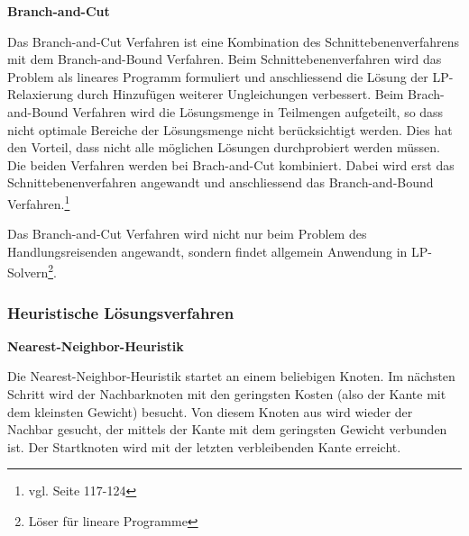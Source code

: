 \documentclass[11pt,a4paper]{article}
\begin{document}
\medskip

\begin{flushleft}
\textbf{Branch-and-Cut}

Das Branch-and-Cut Verfahren ist eine Kombination des Schnittebenenverfahrens mit dem Branch-and-Bound Verfahren. 
Beim Schnittebenenverfahren wird das Problem als lineares Programm formuliert und anschliessend die Lösung der LP-Relaxierung durch Hinzufügen weiterer Ungleichungen verbessert.
Beim Brach-and-Bound Verfahren wird die Lösungsmenge in Teilmengen aufgeteilt, so dass nicht optimale Bereiche der Lösungsmenge nicht berücksichtigt werden. Dies hat den Vorteil, dass nicht alle möglichen Lösungen durchprobiert werden müssen.
Die beiden Verfahren werden bei Brach-and-Cut kombiniert. Dabei wird erst das Schnittebenenverfahren angewandt und anschliessend das Branch-and-Bound Verfahren.\footnote{vgl. \cite{applegate06} Seite 117-124}

Das Branch-and-Cut Verfahren wird nicht nur beim Problem des Handlungsreisenden angewandt, sondern findet allgemein Anwendung in LP-Solvern\footnote{Löser für lineare Programme}.

\end{flushleft}

\subsubsection{Heuristische Lösungsverfahren}
\begin{flushleft}
\textbf{Nearest-Neighbor-Heuristik}

Die Nearest-Neighbor-Heuristik startet an einem beliebigen Knoten. Im nächsten Schritt wird der Nachbarknoten mit den geringsten Kosten (also der Kante mit dem kleinsten Gewicht) besucht. Von diesem Knoten aus wird wieder der Nachbar gesucht, der mittels der Kante  mit dem geringsten Gewicht verbunden ist. Der Startknoten wird mit der letzten verbleibenden Kante erreicht.\cite{gutin02}
\end{flushleft}

\medskip
\end{document}
